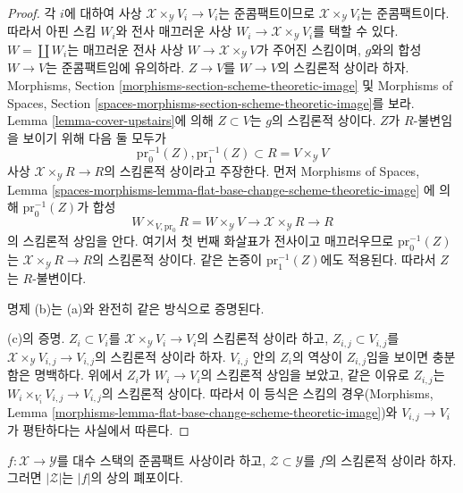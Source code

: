\begin{proof}
\medskip\noindent
각 $i$에 대하여 사상
$\mathcal{X} \times_\mathcal{Y} V_i \to V_i$는 준콤팩트이므로
$\mathcal{X} \times_\mathcal{Y} V_i$는 준콤팩트이다. 따라서 아핀 스킴
$W_i$와 전사 매끄러운 사상
$W_i \to \mathcal{X} \times_\mathcal{Y} V_i$를 택할 수 있다.
$W = \coprod W_i$는 매끄러운 전사 사상
$W \to \mathcal{X} \times_\mathcal{Y} V$가 주어진 스킴이며, $g$와의
합성 $W \to V$는 준콤팩트임에 유의하라. $Z \to V$를 $W \to V$의
스킴론적 상이라 하자. Morphisms, Section
\ref{morphisms-section-scheme-theoretic-image} 및 Morphisms of Spaces,
Section \ref{spaces-morphisms-section-scheme-theoretic-image}를 보라.
Lemma \ref{lemma-cover-upstairs}에 의해 $Z \subset V$는 $g$의 스킴론적
상이다. $Z$가 $R$-불변임을 보이기 위해 다음 둘 모두가
$$
\text{pr}_0^{-1}(Z), \text{pr}_1^{-1}(Z) \subset R = V \times_\mathcal{Y} V
$$
사상 $\mathcal{X} \times_\mathcal{Y} R \to R$의 스킴론적 상이라고
주장한다. 먼저 Morphisms of Spaces, Lemma
\ref{spaces-morphisms-lemma-flat-base-change-scheme-theoretic-image}
에 의해 $\text{pr}_0^{-1}(Z)$가 합성
$$
W \times_{V, \text{pr}_0} R = W \times_\mathcal{Y} V \to
\mathcal{X} \times_\mathcal{Y} R \to R
$$
의 스킴론적 상임을 안다. 여기서 첫 번째 화살표가 전사이고 매끄러우므로
$\text{pr}_0^{-1}(Z)$는
$\mathcal{X} \times_\mathcal{Y} R \to R$의 스킴론적 상이다. 같은
논증이
$\text{pr}_1^{-1}(Z)$에도 적용된다. 따라서 $Z$는 $R$-불변이다.

\medskip\noindent
명제 (b)는 (a)와 완전히 같은 방식으로 증명된다.

\medskip\noindent
(c)의 증명. $Z_i \subset V_i$를
$\mathcal{X} \times_\mathcal{Y} V_i \to V_i$의 스킴론적 상이라 하고,
$Z_{i, j} \subset V_{i, j}$를
$\mathcal{X} \times_\mathcal{Y} V_{i, j} \to V_{i, j}$의 스킴론적 상이라
하자. $V_{i, j}$ 안의 $Z_i$의 역상이 $Z_{i, j}$임을 보이면 충분함은
명백하다. 위에서 $Z_i$가 $W_i \to V_i$의 스킴론적 상임을 보았고, 같은
이유로 $Z_{i, j}$는
$W_i \times_{V_i} V_{i, j} \to V_{i, j}$의 스킴론적 상이다. 따라서 이
등식은 스킴의 경우(Morphisms, Lemma
\ref{morphisms-lemma-flat-base-change-scheme-theoretic-image})와
$V_{i, j} \to V_i$가 평탄하다는 사실에서 따른다.
\end{proof}

\begin{lemma}
\label{lemma-topology-scheme-theoretic-image}
$f : \mathcal{X} \to \mathcal{Y}$를 대수 스택의 준콤팩트 사상이라 하고,
$\mathcal{Z} \subset \mathcal{Y}$를 $f$의 스킴론적 상이라 하자. 그러면
$|\mathcal{Z}|$는 $|f|$의 상의 폐포이다.
\end{lemma}

